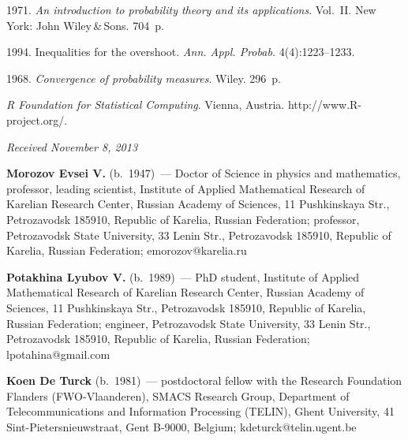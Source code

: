 \begin{multicols}{2}
{{\begin{thebibliography}{9}
1971. \textit{An introduction to probability theory and its applications}. Vol.~II.
 New York: John Wiley\,\&\,Sons. 704~p.
 {
 
 }



1994. Inequalities for the overshoot. \textit{Ann. Appl. Probab.}  4(4):1223--1233.

  1968.
\textit{Convergence of probability measures}. Wiley. 296~p.

\textit{R Foundation for Statistical Computing}.
  Vienna, Austria.  {\sf http://www.R-project.org/}.
\end{thebibliography} } }

\end{multicols}

\vspace*{-6pt}

\hfill{\small\textit{Received November 8, 2013}}

\vspace*{-6pt}

\Contr

\noindent
\textbf{Morozov Evsei V.} (b.\ 1947)~--- Doctor of Science in physics and mathematics, professor,
leading scientist, Institute of Applied Mathematical Research of Karelian Research Center,
Russian Academy of Sciences, 11 Pushkinskaya Str., Petrozavodsk 185910,
Republic of Karelia, Russian Federation; professor, Petrozavodsk State University,
33 Lenin Str., Petrozavodsk 185910, Republic of Karelia,
Russian Federation; emorozov@karelia.ru

\vspace*{3pt}

\noindent
\textbf{Potakhina Lyubov V.} (b.\ 1989)~--- PhD student, 
Institute of Applied Mathematical Research of Karelian Research Center,
Russian Academy of Sciences, 11 Pushkinskaya Str., Petrozavodsk 185910,
Republic of Karelia, Russian Federation; engineer, Petrozavodsk State University,
33 Lenin Str., Petrozavodsk 185910, Republic of Karelia,
Russian Federation; lpotahina@gmail.com

\vspace*{3pt}

\noindent
\textbf{Koen De Turck} (b.\ 1981)~--- postdoctoral fellow with the Research Foundation
Flanders (FWO-Vlaanderen), SMACS Research Group, Department of Telecommunications
and Information Processing (TELIN), Ghent University, 41 Sint-Pietersnieuwstraat,  Gent B-9000,
Belgium;  kdeturck@telin.ugent.be




